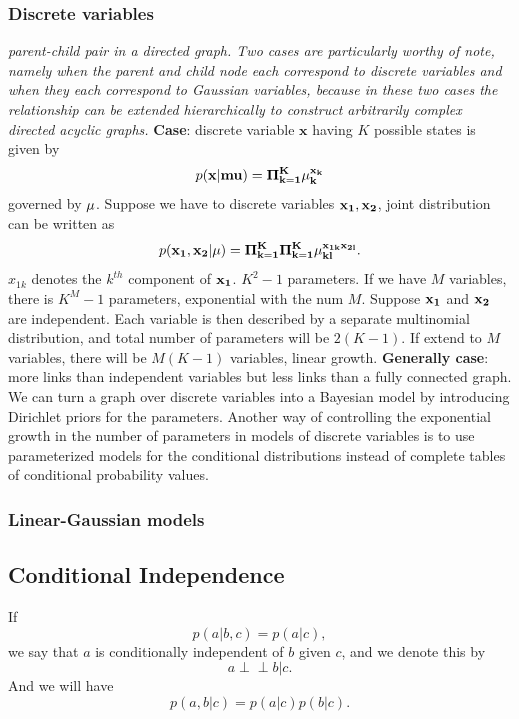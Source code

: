 \documentclass[a4paper]{book}
\def\ci{\perp\!\!\!\perp}
\begin{document}
\subsubsection{Discrete variables}
\textit{parent-child pair in a directed graph. Two cases are particularly worthy of note, namely when the parent and child node each correspond to discrete variables and when they each correspond to Gaussian variables, because in these two cases the relationship can be extended hierarchically to construct arbitrarily complex directed acyclic graphs.}
\newline
\textbf{Case}:  discrete variable $\textbf{x}$ having $K$ possible states is given by
\begin{equation}\label{eq8.5}
  p(\bf{x}|\bf{mu}) =  \Pi_{k=1}^K\mu_k^{x_k}
\end{equation} governed by $\bf{\mu}$.
Suppose we have to discrete variables $\bf x_1, \bf x_2$, joint distribution can be written as
\begin{equation}\label{eq8.6}
  p(\bf x_1, \bf x_2|\bf{\mu})=\Pi_{k=1}^K\Pi_{k=1}^K\mu_{kl}^{x_{1k}x_{2l}}.
\end{equation}
$x_{1k}$ denotes the $k^{th}$ component of $\bf x_1$.
\newline
$K^2-1$ parameters. If we have $M$ variables, there is $K^M-1$ parameters, exponential with the num $M$.
\newline
Suppose $\bf x_1$ and $\bf x_2$ are independent. Each variable is then described by a separate multinomial distribution, and total number of parameters will be $2(K-1)$. If extend to $M$ variables, there will be $M(K-1)$ variables, linear growth.
\newline
\textbf{Generally case}: more links than independent variables but less links than a fully connected graph.
\newline
We can turn a graph over discrete variables into a Bayesian model by introducing Dirichlet priors for the parameters.
\newline
Another way of controlling the exponential growth in the number of parameters
in models of discrete variables is to use parameterized models for the conditional
distributions instead of complete tables of conditional probability values.
\subsubsection{Linear-Gaussian models}

\subsection{Conditional Independence}
If
\begin{equation}\label{eq8.7}
  p(a|b, c) = p(a|c),
\end{equation}
we say that $a$ is conditionally independent of $b$ given $c$, and we denote this by $$a\ci b|c .$$  And we will have
\begin{equation}\label{eq8.8}
  p(a,b|c) = p(a|c)p(b|c).
\end{equation}
\end{document}
